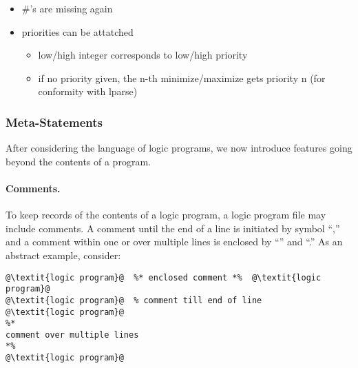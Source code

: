 \begin{newstuff}
	\begin{itemize}
		\item \#'s are missing again
		\item priorities can be attatched
			\begin{itemize}
				\item low/high integer corresponds to low/high priority
				\item if no priority given, the n-th minimize/maximize gets priority n
					  (for conformity with lparse)
			\end{itemize}
	\end{itemize}
\end{newstuff}

\subsubsection{Meta-Statements}\label{subsec:gringo:meta}

After considering the language of logic programs,
we now introduce features going beyond the contents of a program.

\paragraph{Comments.}
To keep records of the contents of a logic program,
a logic program file may include comments.
A comment until the end of a line is initiated by symbol ``\code{\%},''
and a comment within one or over multiple lines is enclosed
by ``\code{\%*}'' and ``\code{*\%}.''
As an abstract example, consider:
%
\begin{lstlisting}[numbers=none,escapechar=@]
@\textit{logic program}@  %* enclosed comment *%  @\textit{logic program}@
@\textit{logic program}@  % comment till end of line
@\textit{logic program}@
%*
comment over multiple lines
*%
@\textit{logic program}@
\end{lstlisting}

